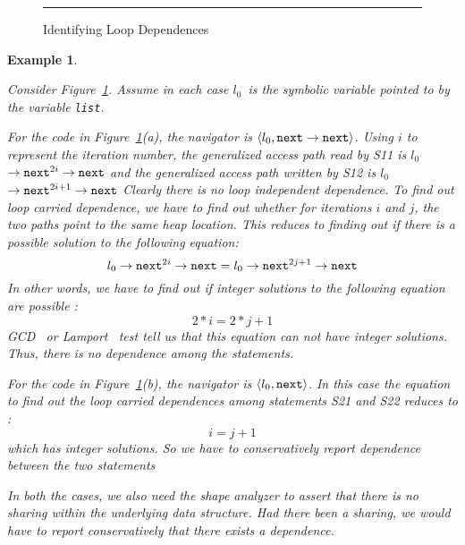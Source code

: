 \documentclass{IOS-Book-Article}
\newtheorem{example}{Example}
\newcommand{\loc}{\ensuremath{l_0}}
\newcommand{\mynext}{\mbox{\tt next}}
\begin{document}
\begin{figure}[t]
  \begin{center}
  \end{center}
  \caption{\label{fig:loopdep} Identifying Loop Dependences}
\hrule
\end{figure}
\begin{example}\label{ex:loopdeps}{\rm 
    Consider Figure~\ref{fig:loopdep}. Assume in each case
    \loc\ is the symbolic variable pointed to by the variable
    {\tt list}.
             
    For the code in Figure~\ref{fig:loopdep}(a), the
    navigator is $\langle\loc,
    \mynext\rightarrow\mynext\rangle$. Using $i$ to represent
    the iteration number, the generalized access path read by
    S11 is \loc$\rightarrow\mynext^{2i}\rightarrow\mynext$ and
    the generalized access path written by S12 is
    \loc$\rightarrow\mynext^{2i+1}\rightarrow\mynext$ Clearly
    there is no loop independent dependence. To find out loop
    carried dependence, we have to find out whether for
    iterations $i$ and $j$, the two paths point to the same
    heap location. This reduces to finding out if there is a
    possible solution to the following equation:
      \[ \loc\rightarrow\mynext^{2i}\rightarrow\mynext  =
      \loc\rightarrow\mynext^{2j+1}\rightarrow\mynext \] 
      In other words, we have to find out if  integer solutions
      to the following equation are possible :
      \[2*i  = 2*j + 1\]
      GCD~\cite{Kennedy01Optimizing} or
      Lamport~\cite{Lamport1974parallel} test tell us that
      this equation can not have integer solutions. Thus,
      there is no dependence among the statements.

      For the code in Figure~\ref{fig:loopdep}(b), the navigator
      is $\langle\loc,
    \mynext\rangle$. In this case the equation to find 
      out the loop carried dependences among statements S21
      and S22 reduces to : 
      \[ i = j + 1\]
      which has integer solutions. So we have to
      conservatively report dependence between the two statements

In both the cases, we also need the shape analyzer to assert
that there is no sharing within the underlying data
structure. Had there been a sharing, we would have to report
conservatively that there exists a dependence.  }
\end{example}
\end{document}
